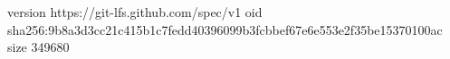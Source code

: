 version https://git-lfs.github.com/spec/v1
oid sha256:9b8a3d3cc21c415b1c7fedd40396099b3fcbbef67e6e553e2f35be15370100ac
size 349680
